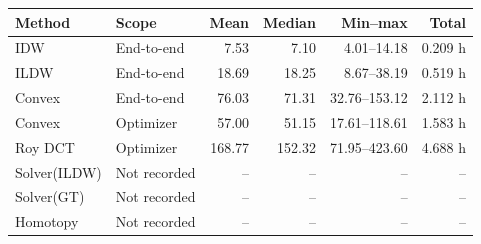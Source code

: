 \begin{tabular}{llrrrr}\toprule Method & Scope & Mean & Median & Min--max & Total\\\midrule
IDW & End-to-end & 7.53 & 7.10 & 4.01--14.18 & 0.209 h \\
ILDW & End-to-end & 18.69 & 18.25 & 8.67--38.19 & 0.519 h \\
Convex & End-to-end & 76.03 & 71.31 & 32.76--153.12 & 2.112 h \\
Convex & Optimizer & 57.00 & 51.15 & 17.61--118.61 & 1.583 h \\
Roy DCT & Optimizer & 168.77 & 152.32 & 71.95--423.60 & 4.688 h \\
Solver(ILDW) & Not recorded & -- & -- & -- & -- \\
Solver(GT) & Not recorded & -- & -- & -- & -- \\
Homotopy & Not recorded & -- & -- & -- & -- \\
\bottomrule\end{tabular}